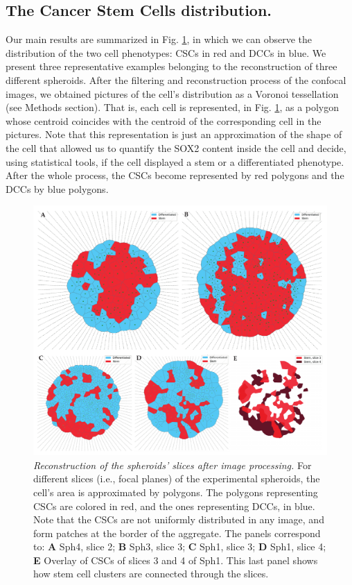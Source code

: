 \documentclass[fleqn,10pt]{wlscirep}
\begin{document}
\subsection*{The Cancer Stem Cells distribution. }

Our main results are summarized in Fig. \ref{fig: blue red}, in which we can observe the distribution of the two cell phenotypes:  CSCs in red and DCCs in blue. We present three representative examples belonging to the reconstruction of three different spheroids. After the filtering and reconstruction process of the confocal images, we obtained pictures of the cell's distribution as a Voronoi tessellation (see Methods section). That is, each cell is represented, in Fig. \ref{fig: blue red}, as a polygon whose centroid coincides with the centroid of the corresponding cell in the pictures. Note that this representation is just an approximation of the shape of the cell that allowed us to quantify the SOX2 content inside the cell and decide, using statistical tools, if the cell displayed a stem or a differentiated phenotype. After the whole process, the CSCs become represented by red polygons and the DCCs by blue polygons. 

\begin{figure}[!ht]
    \includegraphics[width=\linewidth]{images/voronoi.pdf}
    \caption{\emph{Reconstruction of the spheroids' slices after image processing.} For different slices (i.e., focal planes) of the experimental spheroids, the cell's area is approximated by polygons. The polygons representing CSCs are colored in red, and the ones representing DCCs, in blue. Note that the CSCs are not uniformly distributed in any image, and form patches at the border of the aggregate. The panels correspond to: \textbf{A} \textsf{ Sph4, slice 2}; \textbf{B} \textsf{ Sph3, slice 3}; \textbf{C} \textsf{ Sph1, slice 3}; \textbf{D} \textsf{ Sph1, slice 4}; \textbf{E} Overlay of CSCs of slices 3 and 4 of \textsf{ Sph1}. This last panel shows how stem cell clusters are connected through the slices. }\label{fig: blue red}
\end{figure}
\end{document}
